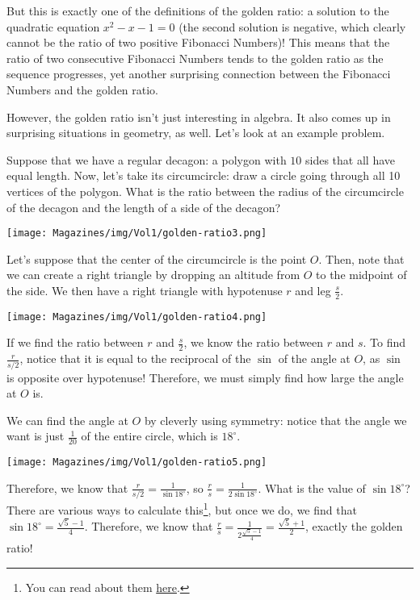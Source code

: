 \documentclass{article}
\begin{document}
\begin{multicols}{3}
{But this is exactly one of the definitions of the golden ratio: a solution to the quadratic equation $x^2-x-1=0$ (the second solution is negative, which clearly cannot be the ratio of two positive Fibonacci Numbers)! This means that the ratio of two consecutive Fibonacci Numbers tends to the golden ratio as the sequence progresses, yet another surprising connection between the Fibonacci Numbers and the golden ratio.

However, the golden ratio isn’t just interesting in algebra. It also comes up in surprising situations in geometry, as well. Let’s look at an example problem.

Suppose that we have a regular decagon: a polygon with $10$ sides that all have equal length. Now, let’s take its circumcircle: draw a circle going through all 10 vertices of the polygon. What is the ratio between the radius of the circumcircle of the decagon and the length of a side of the decagon?

\begin{center}
    \texttt{[image: Magazines/img/Vol1/golden-ratio3.png]}
\end{center}

Let’s suppose that the center of the circumcircle is the point $O$. Then, note that we can create a right triangle by dropping an altitude from $O$ to the midpoint of the side. We then have a right triangle with hypotenuse $r$ and leg $\frac s2$.

\begin{center}
   \texttt{[image: Magazines/img/Vol1/golden-ratio4.png]}
\end{center}

If we find the ratio between $r$ and $\frac{s}{2}$, we know the ratio between $r$ and $s$. To find $\frac{r}{s/2}$, notice that it is equal to the reciprocal of the $\sin$ of the angle at $O$, as $\sin$ is opposite over hypotenuse! Therefore, we must simply find how large the angle at $O$ is.

We can find the angle at $O$ by cleverly using symmetry: notice that the angle we want is just $\frac1{20}$ of the entire circle, which is $18^\circ$.

\begin{center}
    \texttt{[image: Magazines/img/Vol1/golden-ratio5.png]}
\end{center}

Therefore, we know that $\frac{r}{s/2} = \frac1{\sin 18^\circ}$, so $\frac rs = \frac1{2\sin 18^\circ}$. What is the value of $\sin 18^\circ$? There are various ways to calculate this\footnote{You can read about them \href{https://math.stackexchange.com/questions/2140356/various-methods-to-find-value-of-sin-18-circ}{here}.}, but once we do, we find that $\sin 18^\circ = \frac{\sqrt5-1}4$. Therefore, we know that $\frac rs = \frac1{2\frac{\sqrt5-1}4} = \frac{\sqrt5+1}2$, exactly the golden ratio!

}
\end{multicols}
\end{document}
